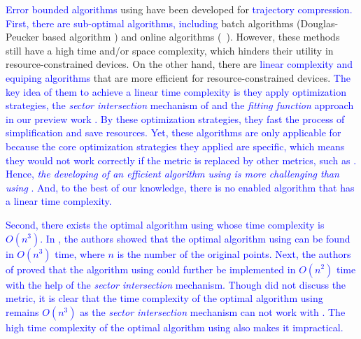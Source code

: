 \textcolor{blue}{Error bounded \lsa algorithms} using \sed have been developed for \textcolor{blue}{trajectory compression. First, there are sub-optimal algorithms, including} batch algorithms (\eg Douglas-Peucker based algorithm \dpsed \cite{Meratnia:Spatiotemporal}) and online algorithms (\eg\ \squishe \cite{Muckell:Compression}).
However, these methods still have a high time and/or space complexity, which hinders their utility in resource-constrained devices. %
%
On the other hand, there are \textcolor{blue}{linear complexity and \ped equiping \lsa algorithms} \cite{Williams:Longest, Sklansky:Cone, Dunham:Cone, Zhao:Sleeve, Lin:Operb} that are more efficient for resource-constrained devices. 
%
\textcolor{blue}{The key idea of them to achieve a linear time complexity is they apply optimization strategies, \eg the \textit{sector intersection} mechanism of \cite{Williams:Longest, Sklansky:Cone, Dunham:Cone, Zhao:Sleeve} and the \textit{fitting function} approach in our preview work \cite {Lin:Operb}. By these optimization strategies, they fast the process of simplification and save resources. 
Yet, these algorithms are only applicable for \ped because the core optimization strategies they applied are \ped specific, which means they would not work correctly if the \ped metric is replaced by other metrics, such as \sed.} 
\textcolor{blue}{Hence, \textit{the developing of an efficient \lsa algorithm using \sed is more challenging than using \ped}.}
\textcolor{blue}{And, to the best of our knowledge, there is no \sed enabled \lsa algorithm that has a linear time complexity.}

\textcolor{blue}{Second, there exists the optimal \lsa algorithm using \sed whose time complexity is $O(n^3)$.
In \cite{Imai:Optimal}, the authors showed that the optimal \lsa algorithm using \ped can be found in $O(n^3)$ time, where $n$ is the number of the original points. Next, the authors of \cite{Chan:Optimal} proved that the algorithm using \ped could further be implemented in $O(n^2)$ time with the help of the \textit{sector intersection} mechanism. 
Though \cite{Chan:Optimal} did not discuss the \sed metric, it is clear that the time complexity of the optimal \lsa algorithm using \sed remains $O(n^3)$ as the \textit{sector intersection} mechanism can not work with \sed. 
The high time complexity of the optimal \lsa algorithm using \sed also makes it impractical.
}




